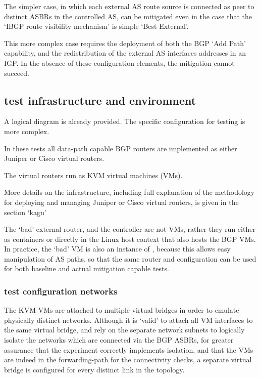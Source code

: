 The simpler case, in which each external AS route source is connected as peer to distinct ASBRs in the controlled AS, can be mitigated even in the case that the `IBGP route visibility mechanism' is simple `Best External'.

This more complex case requires the deployment of both the BGP `Add Path' capability, and the redistribution of the external AS interfaces addresses in an IGP.  In the absence of these configuration elements, the mitigation cannot succeed.


\subsection{test infrastructure and environment}

A logical diagram is already provided.  The specific configuration for testing is more complex.

In these tests all data-path capable BGP routers are implemented as either Juniper or Cisco virtual routers.

The virtual routers run as KVM virtual machines (VMs).

More details on the infrastructure, including full explanation of the methodology for deploying and managing Juniper or Cisco virtual routers, is given in the section `kagu'

The `bad' external router, and the \hbgp controller are not VMs, rather they run either as containers or directly in the Linux host context that also hosts the BGP VMs.  In practice, the `bad' VM is also an instance of \hbgp, because this allows easy manipulation of AS paths, so that the same router and configuration can be used for both baseline and actual mitigation capable tests.

\subsubsection{test configuration networks}
The KVM VMs are attached to multiple virtual bridges in order to emulate physically distinct networks.
Although it is `valid' to attach all VM interfaces to the same virtual bridge, and rely on the separate network subnets to logically isolate the networks which are connected via the BGP ASBRs, for greater assurance that the experiment correctly implements isolation, and that the VMs are indeed in the forwarding-path for the connectivity checks, a separate virtual bridge is configured for every distinct link in the topology.


